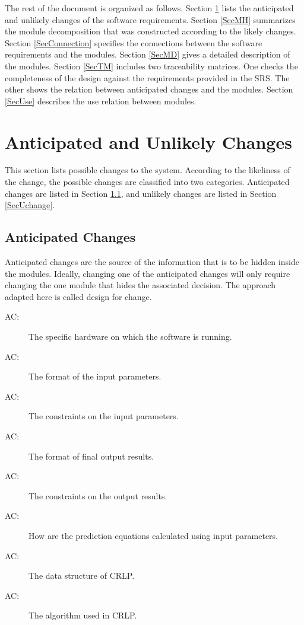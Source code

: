 \documentclass[12pt, titlepage]{article}
\newcounter{acnum}
\newcommand{\actheacnum}{AC\theacnum}
\begin{document}
The rest of the document is organized as follows. Section \ref{SecChange} lists the anticipated and unlikely changes of the software requirements. Section \ref{SecMH} summarizes the module decomposition that was constructed according to the likely changes. Section \ref{SecConnection} specifies the connections between the software requirements and the modules. Section \ref{SecMD} gives a detailed description of the modules. Section \ref{SecTM} includes two traceability matrices. One checks the completeness of the design against the requirements provided in the SRS. The other shows the relation between anticipated changes and the modules. Section \ref{SecUse} describes the use relation between modules.

\section{Anticipated and Unlikely Changes} \label{SecChange}

This section lists possible changes to the system. According to the likeliness
of the change, the possible changes are classified into two categories. Anticipated changes are listed in Section \ref{SecAchange}, and unlikely changes are listed in Section \ref{SecUchange}.

\subsection{Anticipated Changes} \label{SecAchange}

Anticipated changes are the source of the information that is to be hidden
inside the modules. Ideally, changing one of the anticipated changes will only
require changing the one module that hides the associated decision. The approach adapted here is called design for change.

\begin{description}
    \item[ \actheacnum \label{acHardware}:] The specific
      hardware on which the software is running.
    \item[ \actheacnum \label{acInput}:] The format of the input parameters.
    \item[ \actheacnum \label{acInputCon}:] The constraints on the input parameters.
    \item[ \actheacnum \label{acOutput}:] The format of final output results.
    \item[ \actheacnum \label{acOutputCon}:] The constraints on the output results.
    \item[ \actheacnum \label{acEqu}:] How are the prediction equations calculated using input parameters.
    \item[ \actheacnum \label{acDataStru}:] The data structure of CRLP.
    \item[ \actheacnum \label{acAlgo}:] The algorithm used in CRLP.
\end{description}
\end{document}

